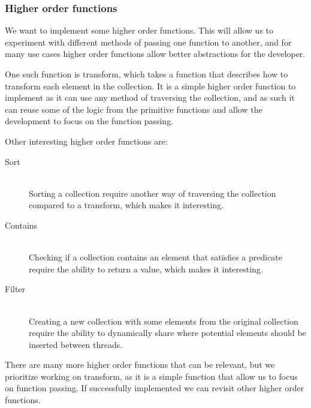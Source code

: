 \subsubsection{Higher order functions}
We want to implement some higher order functions. This will allow us to experiment with different methods of passing one function to another, and for many use cases higher order functions allow better abstractions for the developer.

One such function is transform, which takes a function that describes how to transform each element in the collection. It is a simple higher order function to implement as it can use any method of traversing the collection, and as such it can reuse some of the logic from the primitive functions and allow the development to focus on the function passing.

Other interesting higher order functions are:
\begin{description}
\item[Sort] \hfill \\ 
Sorting a collection require another way of traversing the collection compared to a transform, which makes it interesting.
\item[Contains] \hfill \\ 
Checking if a collection contains an element that satisfies a predicate require the ability to return a value, which makes it interesting.
\item[Filter] \hfill \\ 
Creating a new collection with some elements from the original collection require the ability to dynamically share where potential elements should be inserted between threads.
\end{description}

There are many more higher order functions that can be relevant, but we prioritize working on transform, as it is a simple function that allow us to focus on function passing. If successfully implemented we can revisit other higher order functions.